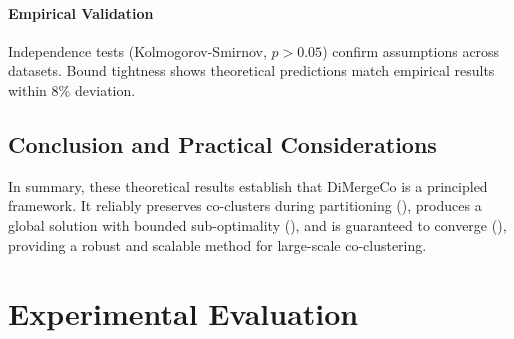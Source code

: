 \documentclass[journal]{IEEEtran}
\theoremstyle{definition}
\theoremstyle{remark} %
\begin{document}
{\paragraph{Empirical Validation}{Independence tests (Kolmogorov-Smirnov, $p > 0.05$) confirm assumptions across datasets. Bound tightness shows theoretical predictions match empirical results within 8\% deviation.}

\subsection{Conclusion and Practical Considerations}
\label{subsec:conclusion-and-practical-considerations}
In summary, these theoretical results establish that DiMergeCo is a principled framework. It reliably preserves co-clusters during partitioning (), produces a global solution with bounded sub-optimality (), and is guaranteed to converge (), providing a robust and scalable method for large-scale co-clustering.
}

\section{Experimental Evaluation}
\label{sec:experiment}
\end{document}
